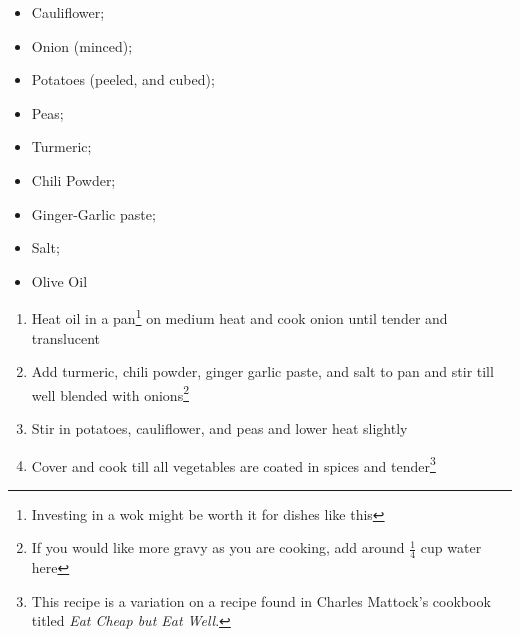 \documentclass[oneside]{recipe}
\newcommand{\recipecolumn}[2]{
	\begin{multicols}{2}
	\raggedcolumns
	#1
	\columnbreak
	#2
	\end{multicols}
}
\begin{document}
\newpage
{}
\recipecolumn{
	\begin{itemize}
		\item Cauliflower;
		\item Onion (minced);
		\item Potatoes (peeled, and cubed);
		\item Peas;
		\item Turmeric;
		\item Chili Powder;
		\item Ginger-Garlic paste; 
		\item Salt;
		\item Olive Oil
	\end{itemize}
}{
	\begin{enumerate}
		\item Heat oil in a pan\footnote{Investing in a wok might be worth it for dishes like this} on medium heat and cook onion until tender and translucent
		\item Add turmeric, chili powder, ginger garlic paste, and salt to pan and stir till well blended with onions\footnote{If you would like more gravy as you are cooking, add around $\frac{1}{4}$ cup water here}
		\item Stir in potatoes, cauliflower, and peas and lower heat slightly
		\item Cover and cook till all vegetables are coated in spices and tender\footnote{This recipe is a variation on a recipe found in Charles Mattock's cookbook titled \textit{Eat Cheap but Eat Well}.}
	\end{enumerate}
}
\end{document}
